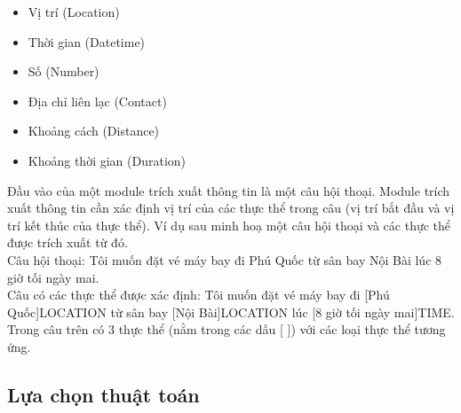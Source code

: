 \begin{itemize}
          \begin{itemize}
              \item Vị trí (Location)
              \item Thời gian (Datetime)
              \item Số (Number)
              \item Địa chỉ liên lạc (Contact)
              \item Khoảng cách (Distance)
              \item Khoảng thời gian (Duration)
          \end{itemize}
          Đầu vào của một module trích xuất thông tin là một câu hội thoại. Module trích xuất thông tin cần xác định vị trí của các thực thể trong câu (vị trí bắt đầu và vị trí kết thúc của thực thể). Ví dụ sau minh hoạ một câu hội thoại và các thực thể được trích xuất từ đó.
          \\
          Câu hội thoại: Tôi muốn đặt vé máy bay đi Phú Quốc từ sân bay Nội Bài lúc 8 giờ tối ngày mai.
          \\
          Câu có các thực thể được xác định: Tôi muốn đặt vé máy bay đi [Phú Quốc]LOCATION từ sân bay [Nội Bài]LOCATION lúc [8 giờ tối ngày mai]TIME.
          \\
          Trong câu trên có 3 thực thể (nằm trong các dấu [ ]) với các loại thực thể tương ứng.
\end{itemize}
\subsection{Lựa chọn thuật toán}

